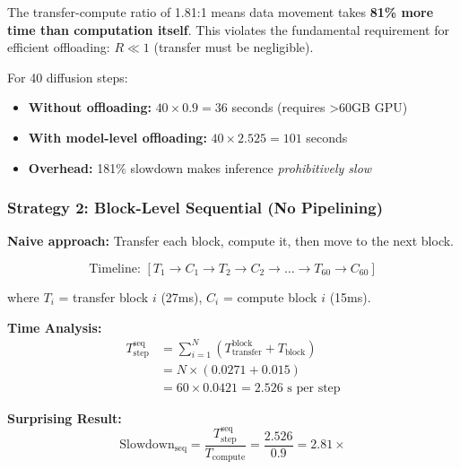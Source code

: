 \begin{tcolorbox}[colback=red!10!white, colframe=red!75!black, title=\textbf{Critical Problem: Transfer Dominates Computation}]
The transfer-compute ratio of 1.81:1 means data movement takes \textbf{81\% more time than computation itself}. This violates the fundamental requirement for efficient offloading: $R \ll 1$ (transfer must be negligible).

For 40 diffusion steps:
\begin{itemize}
    \item \textbf{Without offloading:} $40 \times 0.9 = 36$ seconds (requires >60GB GPU)
    \item \textbf{With model-level offloading:} $40 \times 2.525 = 101$ seconds
    \item \textbf{Overhead:} 181\% slowdown makes inference \textit{prohibitively slow}
\end{itemize}
\end{tcolorbox}

\subsubsection{Strategy 2: Block-Level Sequential (No Pipelining)}

\textbf{Naive approach:} Transfer each block, compute it, then move to the next block.

\begin{equation}
\boxed{
\text{Timeline: } [T_1 \to C_1 \to T_2 \to C_2 \to \ldots \to T_{60} \to C_{60}]
}
\end{equation}

where $T_i$ = transfer block $i$ (27ms), $C_i$ = compute block $i$ (15ms).

\textbf{Time Analysis:}
\begin{align}
T_{\text{step}}^{\text{seq}} &= \sum_{i=1}^{N} (T_{\text{transfer}}^{\text{block}} + T_{\text{block}}) \nonumber \\
&= N \times (0.0271 + 0.015) \nonumber \\
&= 60 \times 0.0421 = 2.526 \text{ s per step} \label{eq:seq_step_time}
\end{align}

\textbf{Surprising Result:}
\begin{equation}
\text{Slowdown}_{\text{seq}} = \frac{T_{\text{step}}^{\text{seq}}}{T_{\text{compute}}} = \frac{2.526}{0.9} = \boxed{2.81\times}
\label{eq:seq_slowdown}
\end{equation}

